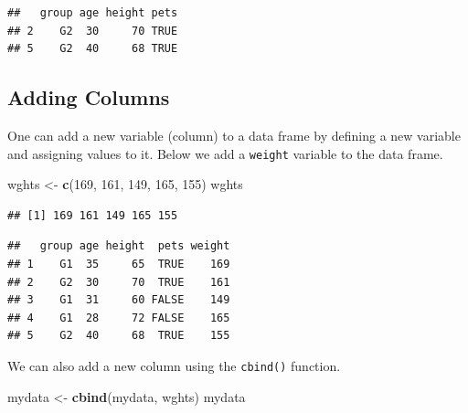 \documentclass[
]{book}
\newenvironment{Shaded}{\begin{snugshade}}{\end{snugshade}}
\newcommand{\DecValTok}[1]{\textcolor[rgb]{0.00,0.00,0.81}{#1}}
\newcommand{\KeywordTok}[1]{\textcolor[rgb]{0.13,0.29,0.53}{\textbf{#1}}}
\newcommand{\NormalTok}[1]{#1}
\newcommand{\OperatorTok}[1]{\textcolor[rgb]{0.81,0.36,0.00}{\textbf{#1}}}
\newcommand{\StringTok}[1]{\textcolor[rgb]{0.31,0.60,0.02}{#1}}
\begin{document}
\begin{verbatim}
##   group age height pets
## 2    G2  30     70 TRUE
## 5    G2  40     68 TRUE
\end{verbatim}

\hypertarget{adding-columns}{%
\subsection*{Adding Columns}\label{adding-columns}}

One can add a new variable (column) to a data frame by defining a new variable and assigning values to it. Below we add a \texttt{weight} variable to the data frame.

\begin{Shaded}
\begin{Highlighting}[]
\NormalTok{wghts <-}\StringTok{ }\KeywordTok{c}\NormalTok{(}\DecValTok{169}\NormalTok{, }\DecValTok{161}\NormalTok{,}
    \DecValTok{149}\NormalTok{, }\DecValTok{165}\NormalTok{, }\DecValTok{155}\NormalTok{)}
\NormalTok{wghts}
\end{Highlighting}
\end{Shaded}

\begin{verbatim}
## [1] 169 161 149 165 155
\end{verbatim}

\begin{Shaded}
\end{Shaded}

\begin{verbatim}
##   group age height  pets weight
## 1    G1  35     65  TRUE    169
## 2    G2  30     70  TRUE    161
## 3    G1  31     60 FALSE    149
## 4    G1  28     72 FALSE    165
## 5    G2  40     68  TRUE    155
\end{verbatim}

We can also add a new column using the \texttt{cbind()} function.

\begin{Shaded}
\begin{Highlighting}[]
\NormalTok{mydata <-}\StringTok{ }\KeywordTok{cbind}\NormalTok{(mydata,}
\NormalTok{    wghts)}
\NormalTok{mydata}
\end{Highlighting}
\end{Shaded}
\end{document}

